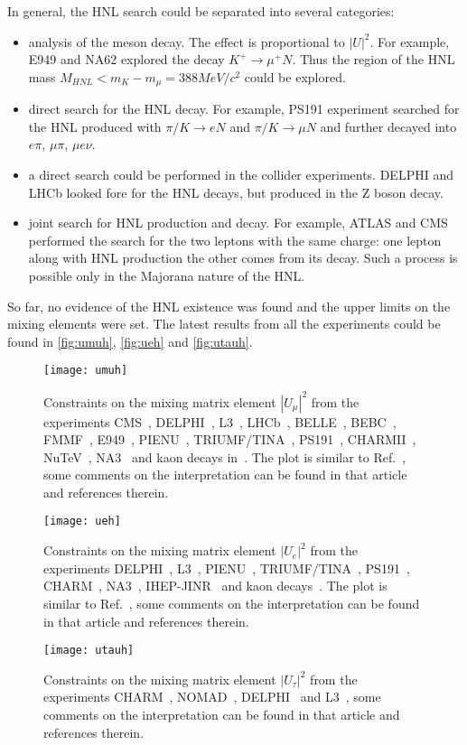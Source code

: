 \documentclass[../main.tex]{subfiles}
\begin{document}
In general, the HNL search could be separated into several categories:
\begin{itemize}
  \item analysis of the meson decay. The effect is proportional to $\left|U\right|^2$. For example, E949 and NA62 explored the decay $K^+\to\mu^+N$. Thus the region of the HNL mass $M_{HNL} < m_K-m_\mu=388 MeV/c^2$ could be explored.
  \item direct search for the HNL decay. For example, PS191 experiment searched for the HNL produced with $\pi/K\to eN$ and $\pi/K\to\mu N$ and further decayed into $e\pi$, $\mu\pi$, $\mu e\nu$.
  \item a direct search could be performed in the collider experiments. DELPHI and LHCb looked fore for the HNL decays, but produced in the Z boson decay.
  \item joint search for HNL production and decay. For example, ATLAS and CMS performed the search for the two leptons with the same charge: one lepton along with HNL production the other comes from its decay. Such a process is possible only in the Majorana nature of the HNL.
\end{itemize}

So far, no evidence of the HNL existence was found and the upper limits on the mixing elements were set. The latest results from all the experiments could be found in \autoref{fig:umuh}, \autoref{fig:ueh} and \autoref{fig:utauh}.

\begin{figure}[!ht]
\centering
\texttt{[image: umuh]}
\caption{Constraints on the mixing matrix element $|U_{\mu}|^2$ from the experiments CMS~\cite{cms}, DELPHI~\cite{delphi}, L3~\cite{l3}, LHCb~\cite{lhcb}, BELLE~\cite{belle}, BEBC~\cite{bebc}, FMMF~\cite{fmmf}, E949~\cite{e949}, PIENU~\cite{pienu}, TRIUMF/TINA~\cite{triumf}, PS191~\cite{Bernardi1988}, CHARMII~\cite{charm2}, NuTeV~\cite{nutev}, NA3~\cite{na3} and kaon decays in~\cite{kaon1,kaon2}. The plot is similar to Ref.~\cite{drewes}, some comments on the interpretation can be found in that article and references therein.}
\label{fig:umuh}
\end{figure}
\begin{figure}[!ht]
\centering
\texttt{[image: ueh]}
\caption{Constraints on the mixing matrix element $|U_{e}|^2$ from the experiments  DELPHI~\cite{delphi},  L3~\cite{l3}, PIENU~\cite{pienu}, TRIUMF/TINA~\cite{triumf}, PS191~\cite{Bernardi1988}, CHARM~\cite{charm}, NA3~\cite{na3}, IHEP-JINR~\cite{jinr} and kaon decays~\cite{kaon1}. The plot is similar to Ref.~\cite{drewes}, some comments on the interpretation can be found in that article and references therein.}
\label{fig:ueh}
\end{figure}
\begin{figure}[!ht]
\centering
\texttt{[image: utauh]}
\caption{Constraints on the mixing matrix element $|U_{\tau}|^2$ from the experiments  CHARM~\cite{orloff2002limits}, NOMAD~\cite{baldisseris2001search}, DELPHI~\cite{delphi} and L3~\cite{l3}, some comments on the interpretation can be found in that article and references therein.}
\label{fig:utauh}
\end{figure}
\end{document}

